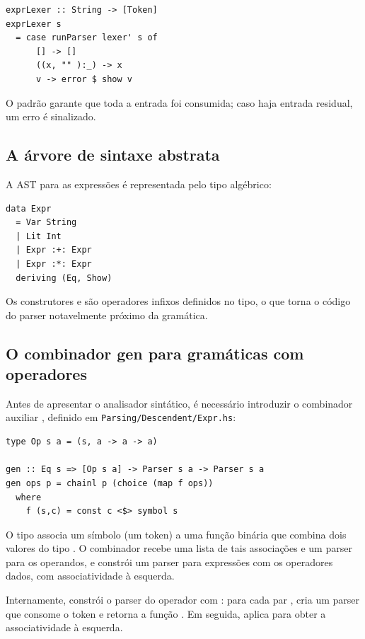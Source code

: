 \begin{verbatim}
exprLexer :: String -> [Token]
exprLexer s
  = case runParser lexer' s of
      [] -> []
      ((x, "" ):_) -> x
      v -> error $ show v
\end{verbatim}

O padrão  garante que toda a entrada
foi consumida; caso haja entrada residual, um erro é sinalizado.

\subsection{A árvore de sintaxe abstrata}

A AST para as expressões é representada pelo tipo algébrico:

\begin{verbatim}
data Expr
  = Var String
  | Lit Int
  | Expr :+: Expr
  | Expr :*: Expr
  deriving (Eq, Show)
\end{verbatim}

Os construtores \haskell{(:+:)} e
\haskell{(:*:)} são operadores infixos definidos no
tipo, o que torna o código do parser notavelmente próximo da gramática.

\subsection{O combinador gen para gramáticas com operadores}

Antes de apresentar o analisador sintático, é necessário introduzir o
combinador auxiliar , definido em
\verb|Parsing/Descendent/Expr.hs|:

\begin{verbatim}
type Op s a = (s, a -> a -> a)

gen :: Eq s => [Op s a] -> Parser s a -> Parser s a
gen ops p = chainl p (choice (map f ops))
  where
    f (s,c) = const c <$> symbol s
\end{verbatim}

O tipo  associa um símbolo
 (um token) a uma função binária que
combina dois valores do tipo . O
combinador  recebe uma lista de tais
associações e um parser para os operandos, e
constrói um parser para
expressões com os operadores dados, com
associatividade à esquerda.

Internamente,  constrói o parser do
operador com : para cada
par , cria um parser que consome o
token  e retorna a função
. Em seguida, aplica
 para obter a associatividade à esquerda.

